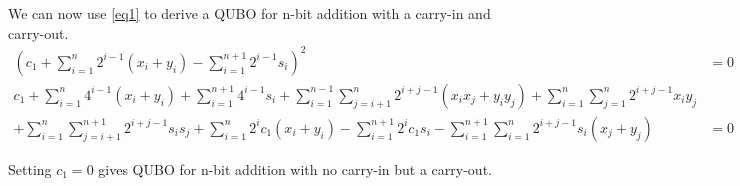 \documentclass[12pt]{article}
\begin{document}
We can now use \ref{eq1} to derive a QUBO for n-bit addition with a carry-in and carry-out.
\begin{align*}
(c_1 + \sum_{i=1}^{n}2^{i-1}(x_i + y_i) - \sum_{i=1}^{n+1}2^{i-1}s_i)^2 &= 0\\
c_1 + \sum_{i=1}^{n}4^{i-1}(x_i+y_i) 
+ \sum_{i=1}^{n+1}4^{i-1}s_i
+ \sum_{i=1}^{n-1}\sum_{j=i+1}^{n}2^{i+j-1}(x_ix_j+y_iy_j) 
+ \sum_{i=1}^n\sum_{j=1}^n2^{i+j-1}x_iy_j \\
+ \sum_{i=1}^n\sum_{j=i+1}^{n+1}2^{i+j-1}s_is_j
+ \sum_{i=1}^n2^ic_1(x_i+y_i)
- \sum_{i=1}^{n+1}2^ic_1s_i
- \sum_{i=1}^{n+1}\sum_{i=1}^n2^{i+j-1}s_i(x_j+y_j)
&= 0
\end{align*}

Setting $c_1=0$ gives QUBO for n-bit addition with no carry-in but a carry-out.
\end{document}
